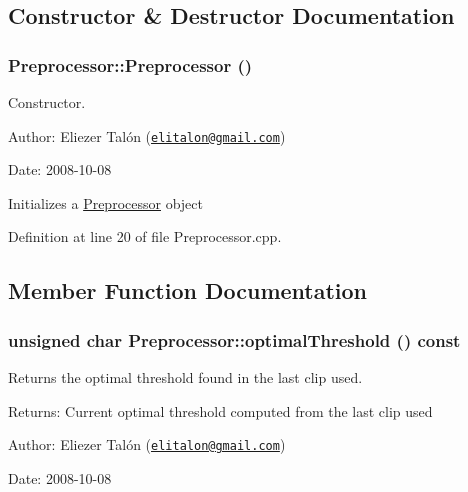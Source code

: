 \subsection{Constructor \& Destructor Documentation}
\hypertarget{class_preprocessor_da966c8b83e7c3bcd8759549c3cdf688}{
\subsubsection[Preprocessor]{\setlength{\rightskip}{0pt plus 5cm}Preprocessor::Preprocessor ()}}
\label{class_preprocessor_da966c8b83e7c3bcd8759549c3cdf688}


Constructor. 

\begin{Desc}
\item[Author:]Eliezer Talón (\href{mailto:elitalon@gmail.com}{\tt elitalon@gmail.com}) \end{Desc}
\begin{Desc}
\item[Date:]2008-10-08\end{Desc}
Initializes a \hyperlink{class_preprocessor}{Preprocessor} object 

Definition at line 20 of file Preprocessor.cpp.

\subsection{Member Function Documentation}
\hypertarget{class_preprocessor_1d8eaa1cf786941dbfa1eca95b46ce0c}{
\subsubsection[optimalThreshold]{\setlength{\rightskip}{0pt plus 5cm}unsigned char Preprocessor::optimalThreshold () const}}
\label{class_preprocessor_1d8eaa1cf786941dbfa1eca95b46ce0c}


Returns the optimal threshold found in the last clip used. 

\begin{Desc}
\item[Returns:]Current optimal threshold computed from the last clip used\end{Desc}
\begin{Desc}
\item[Author:]Eliezer Talón (\href{mailto:elitalon@gmail.com}{\tt elitalon@gmail.com}) \end{Desc}
\begin{Desc}
\item[Date:]2008-10-08 \end{Desc}


